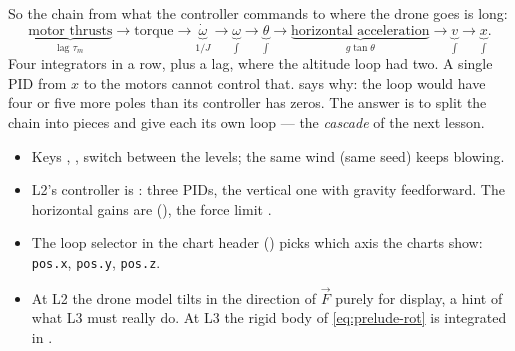 So the chain from what the controller commands to where the drone goes is long:
\begin{equation}\label{eq:tilt-chain}
  \underbrace{\text{motor thrusts}}_{\text{lag }\tau_m} \to \text{torque} \to \underbrace{\dot\omega}_{1/J} \to \underbrace{\omega}_{\int} \to \underbrace{\theta}_{\int} \to \underbrace{\text{horizontal acceleration}}_{g\tan\theta} \to \underbrace{v}_{\int} \to \underbrace{x}_{\int} .
\end{equation}
Four integrators in a row, plus a lag, where the altitude loop had two. A single PID from $x$ to the motors cannot control that.  says why: the loop would have four or five more poles than its controller has zeros. The answer is to split the chain into pieces and give each its own loop — the \emph{cascade} of the next lesson.


\begin{inapp}
\begin{itemize}[leftmargin=1.2em]
  \item Keys , ,  switch between the levels; the same wind (same seed) keeps blowing.
  \item L2's controller is : three PIDs, the vertical one with gravity feedforward. The horizontal gains are  (), the force limit .
  \item The loop selector in the chart header () picks which axis the charts show: \texttt{pos.x}, \texttt{pos.y}, \texttt{pos.z}.
  \item At L2 the drone model tilts in the direction of $\vec F$ purely for display, a hint of what L3 must really do. At L3 the rigid body of \cref{eq:prelude-rot} is integrated in .
\end{itemize}
\end{inapp}

